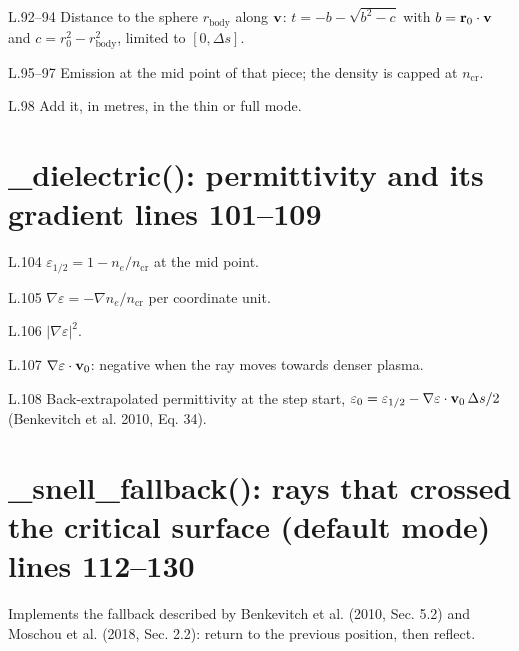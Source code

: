 \begin{lines}
\item[L.92–94] Distance to the sphere $r_\text{body}$ along $\mathbf{v}$: $t=-b-\sqrt{b^2-c}$ with $b=\mathbf{r}_0\cdot\mathbf{v}$ and $c=r_0^2-r_\text{body}^2$, limited to $[0,\Delta s]$.
\item[L.95–97] Emission at the mid point of that piece; the density is capped at $n_\text{cr}$.
\item[L.98] Add it, in metres, in the thin or full mode.
\end{lines}
\section*{\normalsize \_dielectric(): permittivity and its gradient \hfill{\small\mdseries\color{gray}lines 101--109}}

\begin{lines}
\item[L.104] $\varepsilon_{1/2}=1-n_e/n_\text{cr}$ at the mid point.
\item[L.105] $\nabla\varepsilon=-\nabla n_e/n_\text{cr}$ per coordinate unit.
\item[L.106] $|\nabla\varepsilon|^2$.
\item[L.107] $\nabla\varepsilon\cdot\mathbf{v}_0$: negative when the ray moves towards denser plasma.
\item[L.108] Back-extrapolated permittivity at the step start, $\varepsilon_0=\varepsilon_{1/2}-\nabla\varepsilon\cdot\mathbf{v}_0\,\Delta s/2$ (Benkevitch et al. 2010, Eq. 34).
\end{lines}
\section*{\normalsize \_snell\_fallback(): rays that crossed the critical surface (default mode) \hfill{\small\mdseries\color{gray}lines 112--130}}

Implements the fallback described by Benkevitch et al. (2010, Sec. 5.2) and Moschou et al. (2018, Sec. 2.2): return to the previous position, then reflect.

